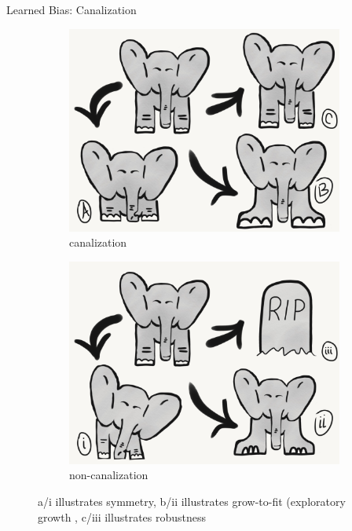 \begin{frame}{Learned Bias: Canalization}
\begin{figure}
  \centering
  \begin{subfigure}[b]{0.5\textwidth}
      \centering
      \includegraphics[width=\textwidth]{img/canalization_cartoon}
      \caption{canalization}
      \label{subfig:canalization}
    \end{subfigure}%
    \hfill
    \begin{subfigure}[b]{0.5\textwidth}
      \centering
      \includegraphics[width=\textwidth]{img/no_canalization_cartoon}
      \caption{non-canalization}
      \label{subfig:no_canalization}
    \end{subfigure}
 	\captionsetup{singlelinecheck=off,justification=raggedright}
    \vspace{-4ex}
  	\caption{a/i illustrates symmetry, b/ii illustrates grow-to-fit (exploratory growth \cite{Downing2015IntelligenceSystems}, c/iii illustrates robustness}
\end{figure}
\end{frame}

